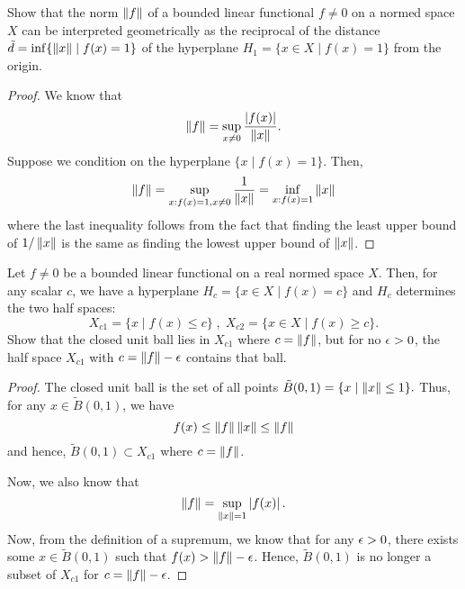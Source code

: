 \begin{question}
    Show that the norm $\left\lVert f \right\rVert$ of a bounded linear functional $f \neq 0$ on a normed space $X$ can be interpreted geometrically as the reciprocal of the distance $\tilde{d} = \inf\{\left\lVert x \right\rVert \mid f(x) = 1\}$ of the hyperplane $H_1 = \{x \in X \mid f(x) = 1\}$ from the origin.
    \label{section2.8-14}
\end{question}
\begin{proof}
    We know that 
    \[\left\lVert f \right\rVert = \sup_{x \neq 0} \frac{\left\lvert f(x) \right\rvert}{\left\lVert x \right\rVert}.\]
    Suppose we condition on the hyperplane $\{x \mid f(x) = 1\}$. Then, 
    \[\left\lVert f \right\rVert = \sup_{x : f(x) = 1 , x\neq 0} \frac{1}{\left\lVert x \right\rVert} = \inf_{x : f(x) = 1} \left\lVert x \right\rVert\]
    where the last inequality follows from the fact that finding the least upper bound of $1/\left\lVert x \right\rVert$ is the same as finding the lowest upper bound of $\left\lVert x \right\rVert$.
\end{proof}

\begin{question}
    Let $f \neq 0$ be a bounded linear functional on a real normed space $X$. Then, for any scalar $c$, we have a hyperplane $H_c = \{x \in X \mid f(x) = c\}$ and $H_c$ determines the two half spaces:
    \[X_{c1} = \{x \mid f(x) \leq c\} \;,\; X_{c2} = \{x \in X \mid f(x) \geq c\}.\]
    Show that the closed unit ball lies in $X_{c1}$ where $c = \left\lVert f \right\rVert$, but for no $\epsilon > 0$, the half space $X_{c1}$ with $c = \left\lVert f \right\rVert - \epsilon$ contains that ball.
    \label{section2.8-15}
\end{question}
\begin{proof}
    The closed unit ball is the set of all points $\tilde{B}(0,1) = \{x \mid \left\lVert x \right\rVert \leq 1\}.$ Thus, for any $x \in \tilde{B}(0,1)$, we have
    \[f(x) \leq \left\lVert f \right\rVert\left\lVert x \right\rVert \leq \left\lVert f \right\rVert\]
    and hence, $\tilde{B}(0,1) \subset X_{c1}$ where $c = \left\lVert f \right\rVert$.

    Now, we also know that
    \[\left\lVert f \right\rVert = \sup_{\left\lVert x \right\rVert = 1} \left\lvert f(x) \right\rvert.\]
    Now, from the definition of a supremum, we know that for any $\epsilon > 0$, there exists some $x \in \tilde{B}(0,1)$ such that $f(x) > \left\lVert f \right\rVert - \epsilon$. Hence, $\tilde{B}(0,1)$ is no longer a subset of $X_{c1}$ for $c = \left\lVert f \right\rVert - \epsilon$.
\end{proof}